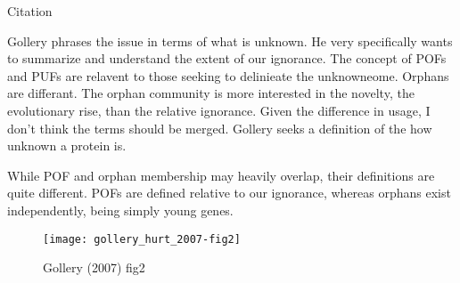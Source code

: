     Citation \cite{gollery_pofs:_2007}

    Gollery phrases the issue in terms of what is unknown. He very
    specifically wants to summarize and understand the extent of our
    ignorance. The concept of POFs and PUFs are relavent to those seeking
    to delinieate the unknowneome. Orphans are differant. The orphan
    community is more interested in the novelty, the evolutionary rise,
    than the relative ignorance. Given the difference in usage, I don't
    think the terms should be merged. Gollery seeks a definition of the how
    unknown a protein is.

    While POF and orphan membership may heavily overlap, their definitions
    are quite different. POFs are defined relative to our ignorance,
    whereas orphans exist independently, being simply young genes.

    \begin{figure}[h!] \centering
        \texttt{[image: gollery\_hurt\_2007-fig2]}
        \caption{Gollery (2007) fig2} \end{figure} \FloatBarrier
